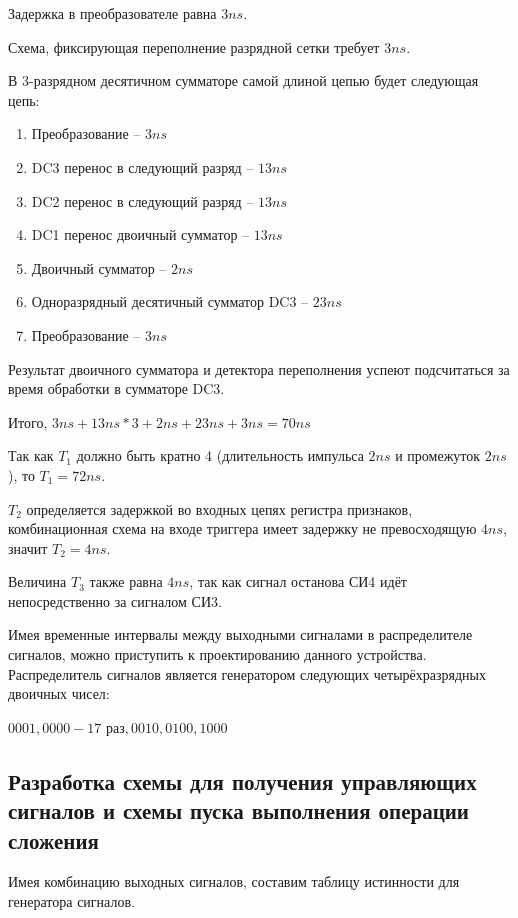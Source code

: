 \documentclass[a4paper,14pt]{article}
\begin{document}
Задержка в преобразователе равна $3ns$.

Схема, фиксирующая переполнение разрядной сетки требует  $3ns$.

В 3-разрядном десятичном сумматоре самой длиной цепью будет следующая цепь:
\begin{enumerate}
	\item Преобразование -- $3ns$
	\item DC3 перенос в следующий разряд -- $13ns$
	\item DC2 перенос в следующий разряд -- $13ns$
	\item DC1 перенос двоичный сумматор -- $13ns$
	\item Двоичный сумматор -- $2ns$
	\item Одноразрядный десятичный сумматор DC3 -- $23ns$
	\item Преобразование -- $3ns$
\end{enumerate}

Результат двоичного сумматора и детектора переполнения успеют подсчитаться за время обработки в сумматоре DC3.

Итого, $3ns + 13ns * 3 + 2ns + 23ns + 3ns = 70ns$

Так как $T_1$ должно быть кратно 4 (длительность  импульса $2ns$ и промежуток $2ns$), то $T_1 = 72ns$.

$T_2$ определяется задержкой во входных цепях регистра признаков, комбинационная схема на входе триггера имеет задержку не превосходящую $4ns$, значит $T_2 = 4ns$.

Величина $T_3$ также равна $4ns$, так как сигнал останова СИ4 идёт непосредственно за сигналом СИ3.

Имея временные интервалы между выходными сигналами в распределителе сигналов, можно приступить к проектированию данного устройства.
Распределитель сигналов является генератором следующих четырёхразрядных двоичных чисел:

$0001,0000 - 17$ раз$, 0010, 0100, 1000$


\subsection{Разработка схемы для получения управляющих сигналов и схемы пуска выполнения операции сложения}

Имея комбинацию выходных сигналов, составим таблицу истинности для генератора сигналов.
\end{document}

